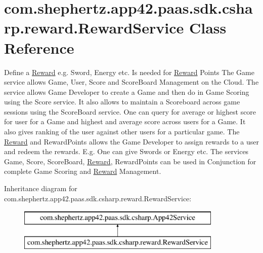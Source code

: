\hypertarget{classcom_1_1shephertz_1_1app42_1_1paas_1_1sdk_1_1csharp_1_1reward_1_1_reward_service}{\section{com.\+shephertz.\+app42.\+paas.\+sdk.\+csharp.\+reward.\+Reward\+Service Class Reference}
\label{classcom_1_1shephertz_1_1app42_1_1paas_1_1sdk_1_1csharp_1_1reward_1_1_reward_service}
}


Define a \hyperlink{classcom_1_1shephertz_1_1app42_1_1paas_1_1sdk_1_1csharp_1_1reward_1_1_reward}{Reward} e.\+g. Sword, Energy etc. Is needed for \hyperlink{classcom_1_1shephertz_1_1app42_1_1paas_1_1sdk_1_1csharp_1_1reward_1_1_reward}{Reward} Points The Game service allows Game, User, Score and Score\+Board Management on the Cloud. The service allows Game Developer to create a Game and then do in Game Scoring using the Score service. It also allows to maintain a Scoreboard across game sessions using the Score\+Board service. One can query for average or highest score for user for a Game and highest and average score across users for a Game. It also gives ranking of the user against other users for a particular game. The \hyperlink{classcom_1_1shephertz_1_1app42_1_1paas_1_1sdk_1_1csharp_1_1reward_1_1_reward}{Reward} and Reward\+Points allows the Game Developer to assign rewards to a user and redeem the rewards. E.\+g. One can give Swords or Energy etc. The services Game, Score, Score\+Board, \hyperlink{classcom_1_1shephertz_1_1app42_1_1paas_1_1sdk_1_1csharp_1_1reward_1_1_reward}{Reward}, Reward\+Points can be used in Conjunction for complete Game Scoring and \hyperlink{classcom_1_1shephertz_1_1app42_1_1paas_1_1sdk_1_1csharp_1_1reward_1_1_reward}{Reward} Management.  


Inheritance diagram for com.\+shephertz.\+app42.\+paas.\+sdk.\+csharp.\+reward.\+Reward\+Service\+:\begin{figure}[H]
\begin{center}
\leavevmode
\includegraphics[height=2.000000cm]{classcom_1_1shephertz_1_1app42_1_1paas_1_1sdk_1_1csharp_1_1reward_1_1_reward_service}
\end{center}
\end{figure}
